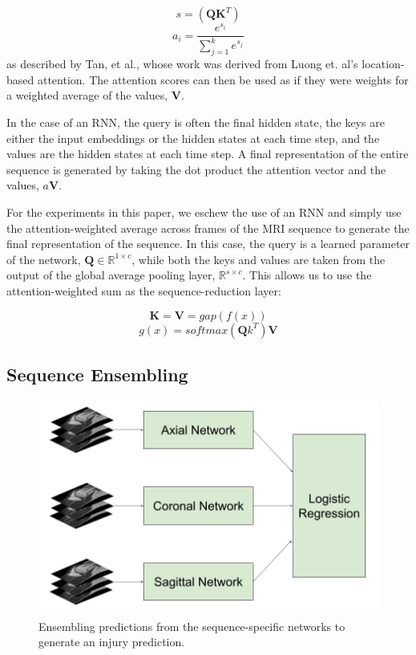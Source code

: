 \documentclass[10pt,twocolumn,letterpaper]{article}
\begin{document}
$$s = (\textbf{Q}\textbf{K}^T)$$
$$a_i = \frac{e^{s_i}}{\sum_{j=1}^k e^{s_j}}$$
 as described by Tan, et al.\cite{tan2018deep}, whose work was derived from Luong et. al's location-based attention\cite{luong2015effective}. The attention scores can then be used as if they were weights for a weighted average of the values, $\textbf{V}$.

In the case of an RNN, the query is often the final hidden state, the keys are either the input embeddings or the hidden states at each time step, and the values are the hidden states at each time step. A final representation of the entire sequence is generated by taking the dot product the attention vector and the values, $a \textbf{V}$.

For the experiments in this paper, we eschew the use of an RNN and simply use the attention-weighted average across frames of the MRI sequence to generate the final representation of the sequence. In this case, the query is a learned parameter of the network, $\textbf{Q} \in \mathbb{R}^{1 \times c}$, while both the keys and values are taken from the output of the global average pooling layer, $\mathbb{R}^{s \times c}$. This allows us to use the attention-weighted sum as the sequence-reduction layer:

$$ \textbf{K} = \textbf{V} = gap(f(x))$$
$$ g(x) = softmax(\textbf{Q} k^T) \textbf{V}$$


\subsection{Sequence Ensembling}


\begin{figure}
\begin{center}
\includegraphics[width=0.8\linewidth]{../images/diagram/ensemble.png}
\end{center}
   \caption{Ensembling predictions from the sequence-specific networks to generate an injury prediction.}
\label{fig:ensemble}
\end{figure}
\end{document}
